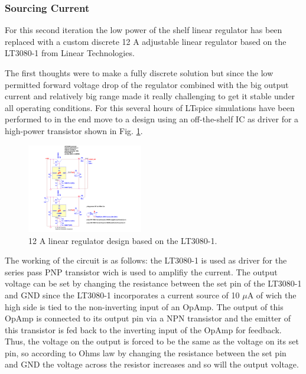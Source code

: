 \subsubsection{Sourcing Current}
For this second iteration the low power of the shelf linear regulator has been replaced with a custom discrete 12 A adjustable linear regulator based on the LT3080-1 from Linear Technologies.

The first thoughts were to make a fully discrete solution but since the low permitted forward voltage drop of the regulator combined with the big output current and relatively big range made it really challenging to get it stable
under all operating conditions. For this several hours of LTspice simulations have been performed to in the end move to a design using an off-the-shelf IC as driver for a high-power transistor shown in Fig. \ref{fig:LT3080-1_LinRegSchematic}.

\begin{figure}[h!]
    \centering
    \includegraphics[width=0.45\textwidth]{LT3080-1_LinRegSchematic.pdf}
    \caption{12 A linear regulator design based on the LT3080-1.}
    \label{fig:LT3080-1_LinRegSchematic}
\end{figure}

The working of the circuit is as follows: the LT3080-1 is used as driver for the series pass PNP transistor wich is used to amplifiy the current.
The output voltage can be set by changing the resistance between the set pin of the LT3080-1 and GND since the LT3080-1 incorporates a current source of 10 $\mu$A of wich the high side is tied to the non-inverting input of an OpAmp. The output of this OpAmp is connected to its output pin via a NPN transistor and the emitter of this transistor is fed back to the inverting input of the OpAmp for feedback. Thus, the voltage on the output is forced to be the same as the voltage on its set pin, so according to Ohms law by changing the resistance between the set pin and GND the voltage across the resistor increases and so will the output voltage.

